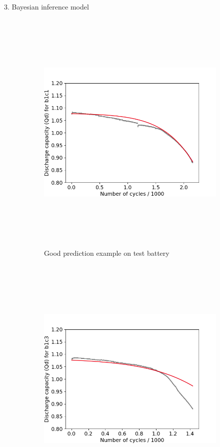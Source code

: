 \documentclass[final]{beamer}
\newlength{\colwidth}
\begin{document}
\begin{frame}[t]
\begin{columns}[t]
\begin{column}{\colwidth}
\begin{block}{3. Bayesian inference model}
    \begin{figure}[H]
        \centering
        \begin{subfigure}[b]{0.49\linewidth}
            \includegraphics[height=12cm,width=\linewidth]{figs/bayes_plot_with_error_b1c1.png}
            \caption{Good prediction example on test battery}
            \label{fig:bayessub1}
        \end{subfigure}
        \begin{subfigure}[b]{0.49\linewidth}
            \includegraphics[height=12cm,width=\linewidth]{figs/bayes_plot_with_error_train_b1c3.png}

\end{subfigure}
\end{figure}
\end{block}
\end{column}
\end{columns}
\end{frame}
\end{document}
